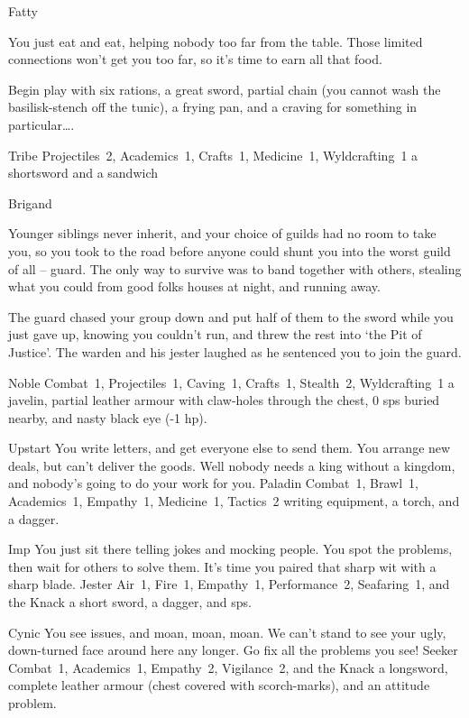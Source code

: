 \begin{multicols}{2}
\begin{itemize}
    {Fatty}%
    {
      You just eat and eat, helping nobody too far from the table.
      Those limited connections won't get you too far, so it's time to earn all that food.

      Begin play with six rations, a great sword, partial chain (you cannot wash the basilisk-stench off the tunic), a frying pan, and a craving for something in particular\ldots.
    }%
    {Tribe}%
    {Projectiles~2, Academics~1, Crafts~1, Medicine~1, Wyldcrafting~1}%
    {a shortsword and a sandwich}%

    {Brigand}%
    {
  Younger siblings never inherit, and your choice of guilds had no room to take you, so you took to the road before anyone could shunt you into the worst guild of all -- \gls{guard}.
  The only way to survive was to band together with others, stealing what you could from good folks houses at night, and running away.

  The \gls{guard} chased your group down and put half of them to the sword while you just gave up, knowing you couldn't run, and threw the rest into `the Pit of Justice'.
  The warden and his jester laughed as he sentenced you to join the \gls{guard}.
  }%
  {Noble}%
  {Combat~1, Projectiles~1, Caving~1, Crafts~1, Stealth~2, Wyldcrafting~1}%
  {a javelin, partial leather armour with claw-holes through the chest, 0 \glspl{sp} buried nearby, and nasty black eye (-1 \gls{hp}).}%


  {Upstart}%
  {You write letters, and get everyone else to send them.
  You arrange new deals, but can't deliver the goods.
  Well nobody needs a king without a kingdom, and nobody's going to do your work for you.
  }%
  {Paladin}%
  {Combat~1, Brawl~1, Academics~1, Empathy~1, Medicine~1, Tactics~2}%
  {writing equipment, a torch, and a dagger.}%

  {Imp}%
  {You just sit there telling jokes and mocking people.
  You spot the problems, then wait for others to solve them.
  It's time you paired that sharp wit with a sharp blade.
  }%
  {Jester}%
  {Air~1, Fire~1, Empathy~1, Performance~2, Seafaring~1, and the Knack \snapcaster}%
  {a short sword, a dagger, and  \glspl{sp}.}%

  {Cynic}%
  {You see issues, and moan, moan, moan.
  We can't stand to see your ugly, down-turned face around here any longer.
  Go fix all the problems you see!
  }%
  {Seeker}%
  {Combat~1, Academics~1, Empathy~2, Vigilance~2, and the Knack \adrenalinesurge}%
  {a longsword, complete leather armour (chest covered with scorch-marks), and an attitude problem.}%



\end{itemize}
\end{multicols}
